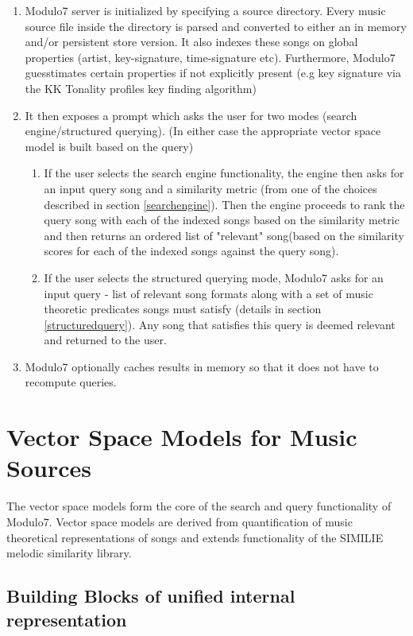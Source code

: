 \documentclass{article}
\begin{document}
\begin{enumerate}
\item Modulo7 server is initialized by specifying a source directory. Every music source file inside the directory is parsed and converted to either an in memory and/or persistent store version. It also indexes these songs on global properties (artist, key-signature, time-signature etc). Furthermore, Modulo7 guesstimates certain properties if not explicitly present (e.g key signature via the KK Tonality profiles key finding \cite{kkTonalityKeyFinding} algorithm)
\item It then exposes a prompt which asks the user for two modes (search engine/structured querying). (In either case the appropriate vector space model is built based on the query)
\begin{enumerate}
\item If the user selects the search engine functionality, the engine then asks for an input query song and a similarity metric (from one of the choices described in section \ref{searchengine}). Then the engine proceeds to rank the query song with each of the indexed songs based on the similarity metric and then returns an ordered list of "relevant" song(based on the similarity scores for each of the indexed songs against the query song). 
\item If the user selects the structured querying mode, Modulo7 asks for an input query - list of relevant song formats along with a set of music theoretic predicates songs must satisfy (details in section \ref{structuredquery}). Any song that satisfies this query is deemed relevant and returned to the user.  
\end{enumerate}
\item Modulo7 optionally caches results in memory so that it does not have to recompute queries.

\end{enumerate}

\section{Vector Space Models for Music Sources} \label{vecmodels}

The vector space models form the core of the search and query functionality of Modulo7. Vector space models are derived from quantification of music theoretical representations of songs and extends functionality of the SIMILIE \cite{similie} melodic similarity library.

\subsection{Building Blocks of unified internal representation}
\end{document}
